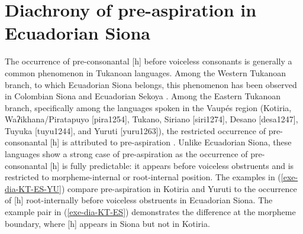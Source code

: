 \documentclass[output=paper]{langscibook}
\begin{document}
\section{Diachrony of pre-aspiration in Ecuadorian Siona}\label{sec-diach}
The occurrence of pre-consonantal [h] before voiceless consonants is generally a common phenomenon in Tukanoan languages. Among the Western Tukanoan branch, to which Ecuadorian Siona belongs, this phenomenon has been observed in Colombian Siona \citep{Wheeler:1987a, Wheeler:1987b} and Ecuadorian Sekoya \citep{JohnsonLevinsohn:1990}. Among the Eastern Tukanoan branch, specifically among the languages spoken in the Vaup\'es region (Kotiria, Waʔikhana/Piratapuyo [pira1254], Tukano, Siriano [siri1274], Desano [desa1247], Tuyuka [tuyu1244], and Yuruti [yuru1263]), the restricted occurrence of pre-consonantal [h] is attributed to pre-aspiration \citep[24--27]{Stenzel:2013}. Unlike Ecuadorian Siona, these languages show a strong case of pre-aspiration as the occurrence of pre-consonantal [h] is fully predictable: it appears before voiceless obstruents and is restricted to morpheme-internal or root-internal position. The examples in (\ref{exe-dia-KT-ES-YU}) compare pre-aspiration in Kotiria and Yuruti to the occurrence of [h] root-internally before voiceless obstruents in Ecuadorian Siona. The example pair in (\ref{exe-dia-KT-ES}) demonstrates the difference at the morpheme boundary, where [h] appears in Siona but not in Kotiria.
\end{document}
